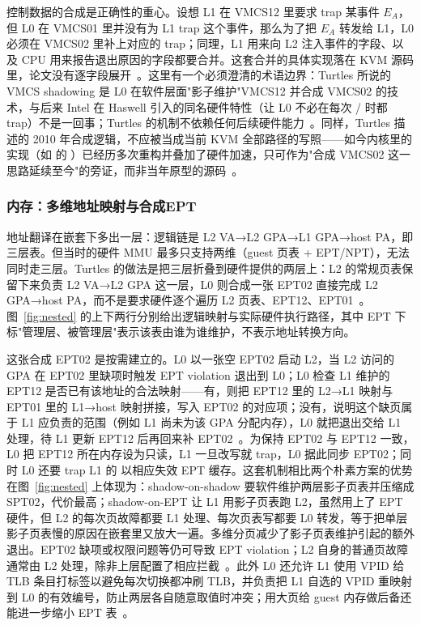 控制数据的合成是正确性的重心。设想 L1 在 VMCS12 里要求 trap 某事件 $E_A$，但 L0 在 VMCS01 里并没有为 L1 trap 这个事件，那么为了把 $E_A$ 转发给 L1，L0 必须在 VMCS02 里补上对应的 trap；同理，L1 用来向 L2 注入事件的字段、以及 CPU 用来报告退出原因的字段都要合并。这套合并的具体实现落在 KVM 源码里，论文没有逐字段展开~\cite{source7}。这里有一个必须澄清的术语边界：Turtles 所说的 VMCS shadowing 是 L0 在软件层面"影子维护"VMCS12 并合成 VMCS02 的技术，与后来 Intel 在 Haswell 引入的同名硬件特性（让 L0 不必在每次 / 时都 trap）不是一回事；Turtles 的机制不依赖任何后续硬件能力~\cite{source7,source8}。同样，Turtles 描述的 2010 年合成逻辑，不应被当成当前 KVM 全部路径的写照——如今内核里的实现（如  的 ）已经历多次重构并叠加了硬件加速，只可作为"合成 VMCS02 这一思路延续至今"的旁证，而非当年原型的源码~\cite{source5}。

\subsubsection{内存：多维地址映射与合成EPT}\label{sec:nested-mem}

地址翻译在嵌套下多出一层：逻辑链是 L2 VA→L2 GPA→L1 GPA→host PA，即三层表。但当时的硬件 MMU 最多只支持两维（guest 页表 + EPT/NPT），无法同时走三层。Turtles 的做法是把三层折叠到硬件提供的两层上：L2 的常规页表保留下来负责 L2 VA→L2 GPA 这一层，L0 则合成一张 EPT02 直接完成 L2 GPA→host PA，而不是要求硬件逐个遍历 L2 页表、EPT12、EPT01~\cite{source7}。图~\ref{fig:nested} 的上下两行分别给出逻辑映射与实际硬件执行路径，其中 EPT 下标"管理层、被管理层"表示该表由谁为谁维护，不表示地址转换方向。

这张合成 EPT02 是按需建立的。L0 以一张空 EPT02 启动 L2，当 L2 访问的 GPA 在 EPT02 里缺项时触发 EPT violation 退出到 L0；L0 检查 L1 维护的 EPT12 是否已有该地址的合法映射——有，则把 EPT12 里的 L2→L1 映射与 EPT01 里的 L1→host 映射拼接，写入 EPT02 的对应项；没有，说明这个缺页属于 L1 应负责的范围（例如 L1 尚未为该 GPA 分配内存），L0 就把退出交给 L1 处理，待 L1 更新 EPT12 后再回来补 EPT02~\cite{source7}。为保持 EPT02 与 EPT12 一致，L0 把 EPT12 所在内存设为只读，L1 一旦改写就 trap，L0 据此同步 EPT02；同时 L0 还要 trap L1 的  以相应失效 EPT 缓存。这套机制相比两个朴素方案的优势在图~\ref{fig:nested} 上体现为：shadow-on-shadow 要软件维护两层影子页表并压缩成 SPT02，代价最高；shadow-on-EPT 让 L1 用影子页表跑 L2，虽然用上了 EPT 硬件，但 L2 的每次页故障都要 L1 处理、每次页表写都要 L0 转发，等于把单层影子页表慢的原因在嵌套里又放大一遍。多维分页减少了影子页表维护引起的额外退出。EPT02 缺项或权限问题等仍可导致 EPT violation；L2 自身的普通页故障通常由 L2 处理，除非上层配置了相应拦截~\cite{source7}。此外 L0 还允许 L1 使用 VPID 给 TLB 条目打标签以避免每次切换都冲刷 TLB，并负责把 L1 自选的 VPID 重映射到 L0 的有效编号，防止两层各自随意取值时冲突；用大页给 guest 内存做后备还能进一步缩小 EPT 表~\cite{source7}。

